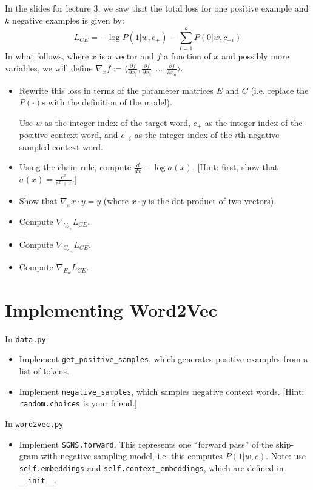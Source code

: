 \documentclass[11pt]{article}
\begin{document}
\vspace{2em}
  In the slides for lecture 3, we saw that the total loss for one positive example and $k$ negative examples is given by:
$$ L_{CE} = -\log P(1 | w, c_+) - \sum_{i=1}^k P(0 | w, c_{-i})$$
In what follows, where $x$ is a vector and $f$ a function of $x$ and possibly more variables, we will define $\nabla_x f := \langle \frac{\partial f}{\partial x_1} , \frac{\partial f}{\partial x_2}, \dots , \frac{\partial f}{\partial x_n} \rangle$.
\begin{itemize}
  \item Rewrite this loss in terms of the parameter matrices $E$ and $C$ (i.e. replace the $P(\cdot)$s with the definition of the model).

        Use $w$ as the integer index of the target word, $c_+$ as the integer index of the positive context word, and $c_{-i}$ as the integer index of the $i$th negative sampled context word.
  \item Using the chain rule, compute $\frac{d}{dx} -\log\sigma(x)$.  [Hint: first, show that $\sigma(x) = \frac{e^x}{e^x+1}$.]
  \item Show that $\nabla_x x \cdot y = y$ (where $x \cdot y$ is the dot product of two vectors).
  \item Compute $\nabla_{C_{c_+}} L_{CE}$.
  \item Compute $\nabla_{C_{c_{-i}}} L_{CE}$.
  \item Compute $\nabla_{E_w} L_{CE}$.
\end{itemize}


\section{Implementing Word2Vec}

 In \texttt{data.py}
\begin{itemize}
  \item Implement \texttt{get\_positive\_samples}, which generates positive examples from a list of tokens.
  \item Implement \texttt{negative\_samples}, which samples negative context words.  [Hint: \texttt{random.choices} is your friend.]
\end{itemize}

\vspace{2em}
 In \texttt{word2vec.py}
\begin{itemize}
  \item Implement \texttt{SGNS.forward}.  This represents one ``forward pass'' of the skip-gram with negative sampling model, i.e. this computes $P(1 | w, c)$.  Note: use \texttt{self.embeddings} and \texttt{self.context\_embeddings}, which are defined in \texttt{\_\_init\_\_}.
\end{itemize}
\end{document}
